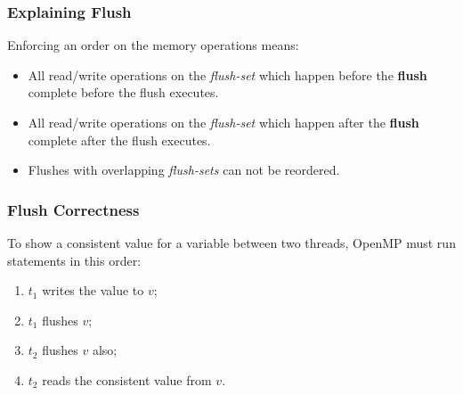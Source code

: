 \documentclass[aspectratio=43]{beamer}
\newenvironment{changemargin}[1]{%
  \begin{list}{}{%
    \setlength{\topsep}{0pt}%
    \setlength{\leftmargin}{#1}%
    \setlength{\rightmargin}{1em}
    \setlength{\listparindent}{\parindent}%
    \setlength{\itemindent}{\parindent}%
    \setlength{\parsep}{\parskip}%
  }%
  \item[]}{\end{list}}
\begin{document}
\begin{frame}
  \frametitle{Explaining Flush}

  \begin{changemargin}{1.5cm}
  Enforcing an order on the memory operations means:

  \begin{itemize}
    \item All read/write operations on the {\it flush-set} which happen
      before the {\bf flush} complete before the flush executes.
    \item All read/write operations on the {\it flush-set} which happen
      after the {\bf flush} complete after the flush executes.
    \item Flushes with overlapping {\it flush-sets} can not be reordered.
  \end{itemize}
  \end{changemargin}
\end{frame}

\begin{frame}
  \frametitle{Flush Correctness}

  \begin{changemargin}{1.5cm}
  To show a consistent value for a variable between two threads, 
  OpenMP must run statements in this order:

  \begin{enumerate}
    \item $t_1$ writes the value to $v$;
    \item $t_1$ flushes $v$; 
    \item $t_2$ flushes $v$ also;
    \item $t_2$ reads the consistent value from $v$.
  \end{enumerate}
  \end{changemargin}
\end{frame}
\end{document}
